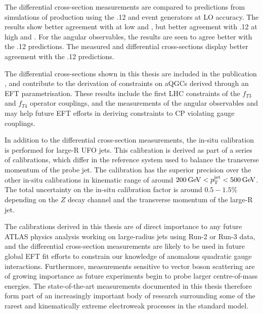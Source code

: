 The differential cross-section measurements are compared to predictions from simulations of \ewwy production using the .12 and  event generators at LO accuracy. The results show better agreement with  at low \mjj and \ptjj, but better agreement with .12 at high \mjj and \ptjj. For the angular observables, the results are seen to agree better with the .12 predictions. The measured \mly and \leppt differential cross-sections display better agreement with the .12 predictions. 

The differential cross-sections shown in this thesis are included in the publication \cite{VBSWy:VBSWy}, and contribute to the derivation of constraints on aQGCs derived through an EFT parametrisation. These results include the first LHC constraints of the $f_{T3}$ and $f_{T4}$ operator couplings, and the measurements of the angular observables \dphisigned and \lepgamdphi may help future EFT efforts in deriving constraints to CP violating gauge couplings.

In addition to the differential cross-section measurements, the \zjets in-situ calibration is performed for large-R UFO jets. This calibration is derived as part of a series of calibrations, which differ in the reference system used to balance the transverse momentum of the probe jet. The \zjets calibration has the superior precision over the other in-situ calibrations in kinematic range of around $200\hspace{2pt}\text{Ge\kern -0.1em V}<p_{\text{T}}^{\text{jet}}<500\hspace{2pt}\text{Ge\kern -0.1em V}$. The total uncertainty on the in-situ calibration factor is around $0.5-1.5\%$ depending on the $Z$ decay channel and the transverse momentum of the large-R jet.

The calibrations derived in this thesis are of direct importance to any future ATLAS physics analysis working on large-radius jets using Run-2 or Run-3 data, and the differential cross-section measurements are likely to be used in future global EFT fit efforts to constrain our knowledge of anomalous quadratic gauge interactions. Furthermore, measurements sensitive to vector boson scattering are of growing importance as future experiments begin to probe larger centre-of-mass energies. The state-of-the-art measurements documented in this thesis therefore form part of an increasingly important body of research surrounding some of the rarest and kinematically extreme electroweak processes in the standard model.
